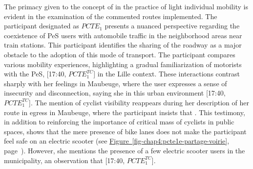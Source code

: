 \begin{refsegment}
The primacy given to the concept of  in the practice of light individual mobility is evident in the examination of the commented routes implemented. The participant designated as \(PCTE_{1}\) presents a nuanced perspective regarding the coexistence of \acrshort{PeS} users with automobile traffic in the neighborhood areas near train stations. This participant identifies the sharing of the roadway as a major obstacle to the adoption of this mode of transport. The participant compares various mobility experiences, highlighting a gradual familiarization of motorists with the \acrshort{PeS},  [17:40, \(PCTE^{TC}_{1}\)] in the Lille context. These interactions contrast sharply with her feelings in Maubeuge, where the user expresses a sense of insecurity and disconnection, saying she  in this urban environment [17:40, \(PCTE^{TC}_{1}\)]. The mention of cyclist visibility reappears during her description of her route in egress in Maubeuge, where the participant insists that . This testimony, in addition to reinforcing the importance of critical mass of cyclists in public spaces, shows that the mere presence of bike lanes does not make the participant feel safe on an electric scooter (see \hyperref[fig-chap4:pcte1e-partage-voirie]{Figure~\ref{fig-chap4:pcte1e-partage-voirie}}, page~\pageref{fig-chap4:pcte1e-partage-voirie}). However, she mentions the presence of a few electric scooter users in the municipality, an observation that  [17:40, \(PCTE^{TC}_{1}\)]. %


\end{refsegment}

